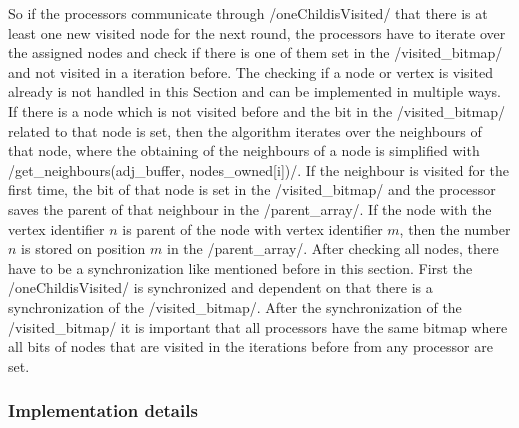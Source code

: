 \documentclass[12pt,a4paper]{article}
\begin{document}
So if the processors communicate through \cinline/oneChildisVisited/ that there is at least one new visited node for the next round, the processors have to iterate over the assigned nodes and check if there is one of them set in the \cinline/visited_bitmap/ and not visited in a iteration before. The checking if a node or vertex is visited already is not handled in this Section and can be implemented in multiple ways. If there is a node which is not visited before and the bit in the \cinline/visited_bitmap/ related to that node is set, then the algorithm iterates over the neighbours of that node, where the obtaining of the neighbours of a node is simplified with \cinline/get_neighbours(adj_buffer, nodes_owned[i])/. If the neighbour is visited for the first time, the bit of that node is set in the \cinline/visited_bitmap/ and the processor saves the parent of that neighbour in the \cinline/parent_array/. If the node with the vertex identifier \(n\) is parent of the node with vertex identifier \(m\), then the number \(n\) is stored on position \(m\) in the \cinline/parent_array/. After checking all nodes, there have to be a synchronization like mentioned before in this section. First the \cinline/oneChildisVisited/ is synchronized and dependent on that there is a synchronization of the \cinline/visited_bitmap/. After the synchronization of the \cinline/visited_bitmap/ it is important that all processors have the same bitmap where all bits of nodes that are visited in the iterations before from any processor are set. 

\subsubsection{Implementation details}
\label{sec:impl_details}
\end{document}
